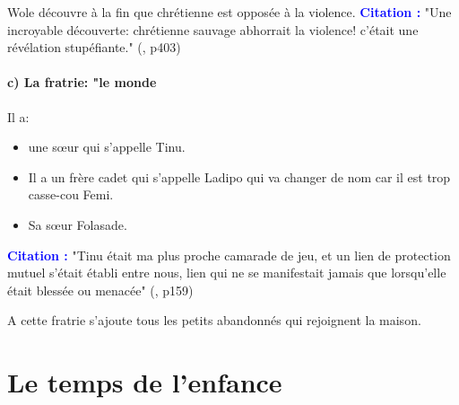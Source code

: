 \documentclass[a4paper, 11pt, hidelinks]{article}
\newcommand{\cit}{\large \textcolor{blue}{\textbf{Citation :}} \large }
\newcommand{\rb}[1]{\Romanbar{#1}}
\begin{document}
Wole découvre à la fin que chrétienne est opposée à la violence.
\cit "Une incroyable découverte: chrétienne sauvage abhorrait la violence! c'était une révélation stupéfiante." (\rb{14}, p403)




\paragraph{c) La fratrie: "le monde}


Il a:

\begin{itemize}
    \item une s\oe ur qui s'appelle Tinu.
    \item Il a un frère cadet qui s'appelle Ladipo qui va changer de nom car il est trop casse-cou Femi.
    \item Sa s\oe ur Folasade.
\end{itemize}


\cit "Tinu était ma plus proche camarade de jeu, et un lien de protection mutuel s'était établi entre nous, lien qui ne se manifestait jamais que 
lorsqu'elle était blessée ou menacée" (\rb{6}, p159)


A cette fratrie s'ajoute tous les petits abandonnés qui rejoignent la maison.






\section{Le temps de l'enfance}
\end{document}
